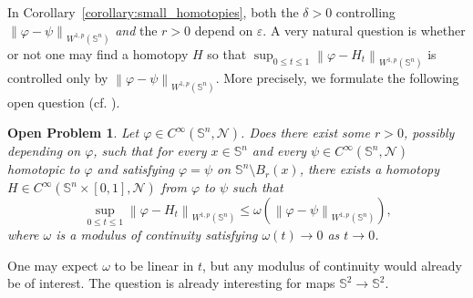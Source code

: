 \documentclass[12pt]{amsart}
\def\n{{\mathcal N}}
\def\n{{\mathcal{M}}}
\def\n{{\mathcal N}}
\def\S{{\mathbb S}}
\newtheorem{openproblem}[theorem]{Open Problem}
\newcommand{\brac}[1]{\left (#1 \right )}
\newcommand{\norm}[1]{\left\|{#1}\right\|}
\numberwithin{theorem}{section} \numberwithin{equation}{section}
\begin{document}
In Corollary~\ref{corollary:small_homotopies}, both the $ \delta > 0 $ controlling $ \norm{\varphi-\psi}_{W^{1,p}(\S^n)} $ \emph{and} the $ r > 0 $ depend on $ \varepsilon $.
A very natural question is whether or not one may find a homotopy $ H $ so that $ \sup_{0 \leq t \leq 1} \norm{\varphi - H_{t}}_{W^{1,p}(\S^n)} $ is controlled only by $ \norm{\varphi-\psi}_{W^{1,p}(\S^n)} $.
More precisely, we formulate the following open question (cf. \cite[Problem, p.11]{MazowieckaStrzelecki}).

\begin{openproblem}
\label{open_problem:small_homotopy}
	Let $ \varphi \in C^{\infty}(\S^n,\n) $.
	Does there exist some $ r > 0 $, possibly depending on $ \varphi $, such that for every $ x \in \S^n $ and every $ \psi \in C^{\infty}(\S^n,\n) $ homotopic to $ \varphi $ and satisfying $ \varphi = \psi $ on $ \S^n \setminus B_r(x)  $, there exists a homotopy $ H \in C^{\infty}(\S^n\times[0,1],\n)$ from $ \varphi $ to $ \psi $ such that
	\[
		\sup_{0 \leq t \leq 1} \norm{\varphi - H_{t}}_{W^{1,p}(\S^n)}
		\leq
		\omega\brac{\norm{\varphi-\psi}_{W^{1,p}(\S^n)}}\text{,}
	\]
	where $ \omega $ is a modulus of continuity satisfying $ \omega\brac{t} \to 0 $ as $ t \to 0 $.
\end{openproblem}

One may expect $ \omega $ to be linear in $ t $, but any modulus of continuity would already be of interest.
The question is already interesting for maps $ \S^2 \to \S^2 $.
\end{document}
